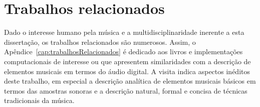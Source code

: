 \section{Trabalhos relacionados}

Dado o interesse humano pela música e a multidisciplinaridade inerente a esta dissertação, os trabalhos relacionados são numerosos. Assim, o Apêndice~\ref{cap:trabalhosRelacionados} é dedicado aos livros e implementações computacionais de interesse ou que apresentem similaridades com a descrição de elementos musicais em termos do áudio digital. A visita indica aspectos inéditos deste trabalho, em especial a descrição analítica de elementos musicais básicos em termos das amostras sonoras e a descrição natural, formal e concisa de técnicas tradicionais da música. 

